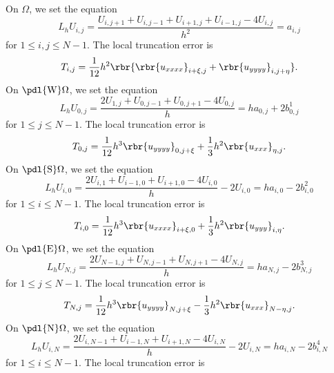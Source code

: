 \documentclass[english, nochinese]{pnote}
\begin{document}
On $\Omega$, we set the equation
\begin{equation}
L_h U_{ i, j } = \frac{ U_{ i, j + 1 } + U_{ i, j - 1 } + U_{ i + 1, j } + U_{ i - 1, j } - 4 U_{ i, j } }{h^2} = a_{ i, j }
\end{equation}
for $ 1 \le i, j \le N - 1 $. The local truncation error is
\begin{equation}
T_{ i, j } = \frac{1}{12} h^2 \rbr{ \rbr{u_{ x x x x }}_{ i + \xi, j }  + \rbr{u_{ y y y y }}_{ i, j + \eta } }.
\end{equation}
On $ \pdl{\text{W}} \Omega $, we set the equation
\begin{equation}
L_h U_{ 0, j } = \frac{ 2 U_{ 1, j } + U_{ 0, j - 1 } + U_{ 0, j + 1 } - 4 U_{ 0, j } }{h} = h a_{ 0, j } + 2 b^1_{ 0, j }
\end{equation}
for $ 1 \le j \le N - 1 $.
The local truncation error is
\begin{equation}
T_{ 0, j } = \frac{1}{12} h^3 \rbr{u_{ y y y y }}_{ 0, j + \xi } + \frac{1}{3} h^2 \rbr{u_{ x x x }}_{ \eta, j }.
\end{equation}
On $ \pdl{\text{S}} \Omega $, we set the equation
\begin{equation}
L_h U_{ i, 0 } = \frac{ 2 U_{ i, 1 } + U_{ i - 1, 0 } + U_{ i + 1, 0 } - 4 U_{ i, 0 } }{h} - 2 U_{ i, 0 } = h a_{ i, 0 } - 2 b^2_{ i, 0 }
\end{equation}
for $ 1 \le i \le N - 1 $.
The local truncation error is
\begin{equation}
T_{ i, 0 } = \frac{1}{12} h^3 \rbr{u_{ x x x x }}_{ i + \xi, 0 } + \frac{1}{3} h^2 \rbr{u_{ y y y }}_{ i, \eta }.
\end{equation}
On $ \pdl{\text{E}} \Omega $, we set the equation
\begin{equation}
L_h U_{ N, j } = \frac{ 2 U_{ N - 1, j } + U_{ N, j - 1 } + U_{ N, j + 1 } - 4 U_{ N, j } }{h} = h a_{ N, j } - 2 b^3_{ N, j }
\end{equation}
for $ 1 \le j \le N - 1 $.
The local truncation error is
\begin{equation}
T_{ N, j } = \frac{1}{12} h^3 \rbr{u_{ y y y y }}_{ N, j + \xi } - \frac{1}{3} h^2 \rbr{u_{ x x x }}_{ N - \eta, j }.
\end{equation}
On $ \pdl{\text{N}} \Omega $, we set the equation
\begin{equation}
L_h U_{ i, N } = \frac{ 2 U_{ i, N - 1 } + U_{ i - 1, N } + U_{ i + 1, N } - 4 U_{ i, N } }{h} - 2 U_{ i, N } = h a_{ i, N } - 2 b^4_{ i, N }
\end{equation}
for $ 1 \le i \le N - 1 $. The local truncation error is
\end{document}
